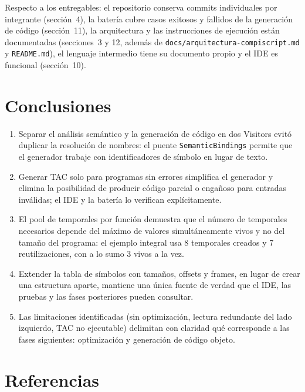 \documentclass[11pt,a4paper]{article}
\begin{document}
Respecto a los entregables: el repositorio conserva commits individuales por
integrante (sección~4), la batería cubre casos exitosos y fallidos de la
generación de código (sección~11), la arquitectura y las instrucciones de
ejecución están documentadas (secciones~3 y 12, además de
\texttt{docs/arquitectura-compiscript.md} y \texttt{README.md}), el lenguaje
intermedio tiene su documento propio y el IDE es funcional (sección~10).

\section{Conclusiones}

\begin{enumerate}[leftmargin=1.6em]
  \item Separar el análisis semántico y la generación de código en dos Visitors
        evitó duplicar la resolución de nombres: el puente
        \texttt{SemanticBindings} permite que el generador trabaje con
        identificadores de símbolo en lugar de texto.
  \item Generar TAC solo para programas sin errores simplifica el generador y
        elimina la posibilidad de producir código parcial o engañoso para
        entradas inválidas; el IDE y la batería lo verifican explícitamente.
  \item El pool de temporales por función demuestra que el número de temporales
        necesarios depende del máximo de valores simultáneamente vivos y no del
        tamaño del programa: el ejemplo integral usa 8 temporales creados y 7
        reutilizaciones, con a lo sumo 3 vivos a la vez.
  \item Extender la tabla de símbolos con tamaños, offsets y frames, en lugar de
        crear una estructura aparte, mantiene una única fuente de verdad que el
        IDE, las pruebas y las fases posteriores pueden consultar.
  \item Las limitaciones identificadas (sin optimización, lectura redundante del
        lado izquierdo, TAC no ejecutable) delimitan con claridad qué
        corresponde a las fases siguientes: optimización y generación de código
        objeto.
\end{enumerate}

\section{Referencias}
\end{document}
